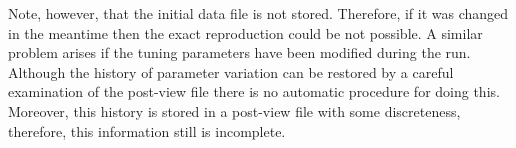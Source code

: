 Note, however, that the initial data file is not stored.
Therefore, if it was changed in the meantime then the exact reproduction 
could be not possible. 
A similar problem arises if the tuning parameters have been modified
during the run.
Although the history of parameter variation can be restored by a careful
examination of the post-view file there is no automatic procedure for
doing this. 
Moreover, this history is stored in a post-view file with some
discreteness, therefore, this information still is incomplete.




